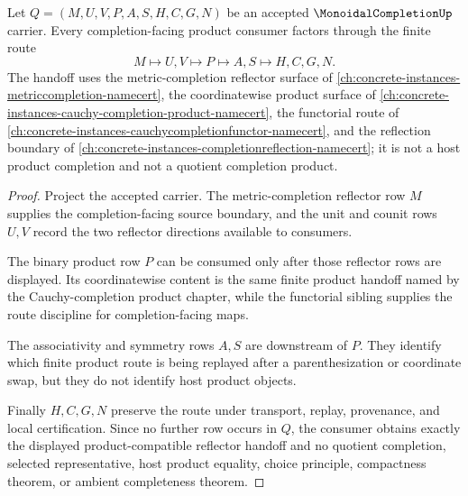 \begin{theorem}
\label{thm:monoidal-completion-product-reflector-handoff}
Let $Q=(M,U,V,P,A,S,H,C,G,N)$ be an accepted $\MonoidalCompletionUp$ carrier. Every completion-facing product consumer factors through the finite route
$$
M\longmapsto U,V\longmapsto P\longmapsto A,S\longmapsto H,C,G,N .
$$
The handoff uses the metric-completion reflector surface of \autoref{ch:concrete-instances-metriccompletion-namecert}, the coordinatewise product surface of \autoref{ch:concrete-instances-cauchy-completion-product-namecert}, the functorial route of \autoref{ch:concrete-instances-cauchycompletionfunctor-namecert}, and the reflection boundary of \autoref{ch:concrete-instances-completionreflection-namecert}; it is not a host product completion and not a quotient completion product.
\end{theorem}
\begin{proof}
Project the accepted carrier. The metric-completion reflector row $M$ supplies the completion-facing source boundary, and the unit and counit rows $U,V$ record the two reflector directions available to consumers.

The binary product row $P$ can be consumed only after those reflector rows are displayed. Its coordinatewise content is the same finite product handoff named by the Cauchy-completion product chapter, while the functorial sibling supplies the route discipline for completion-facing maps.

The associativity and symmetry rows $A,S$ are downstream of $P$. They identify which finite product route is being replayed after a parenthesization or coordinate swap, but they do not identify host product objects.

Finally $H,C,G,N$ preserve the route under transport, replay, provenance, and local certification. Since no further row occurs in $Q$, the consumer obtains exactly the displayed product-compatible reflector handoff and no quotient completion, selected representative, host product equality, choice principle, compactness theorem, or ambient completeness theorem.
\end{proof}

